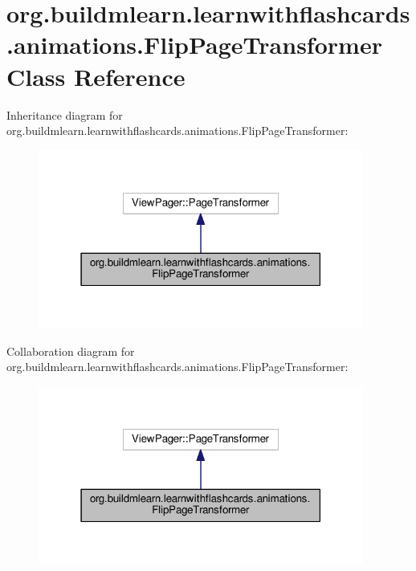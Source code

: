 \hypertarget{classorg_1_1buildmlearn_1_1learnwithflashcards_1_1animations_1_1FlipPageTransformer}{}\section{org.\+buildmlearn.\+learnwithflashcards.\+animations.\+Flip\+Page\+Transformer Class Reference}
\label{classorg_1_1buildmlearn_1_1learnwithflashcards_1_1animations_1_1FlipPageTransformer}


Inheritance diagram for org.\+buildmlearn.\+learnwithflashcards.\+animations.\+Flip\+Page\+Transformer\+:
\nopagebreak
\begin{figure}[H]
\begin{center}
\leavevmode
\includegraphics[width=303pt]{classorg_1_1buildmlearn_1_1learnwithflashcards_1_1animations_1_1FlipPageTransformer__inherit__graph}
\end{center}
\end{figure}


Collaboration diagram for org.\+buildmlearn.\+learnwithflashcards.\+animations.\+Flip\+Page\+Transformer\+:
\nopagebreak
\begin{figure}[H]
\begin{center}
\leavevmode
\includegraphics[width=303pt]{classorg_1_1buildmlearn_1_1learnwithflashcards_1_1animations_1_1FlipPageTransformer__coll__graph}
\end{center}
\end{figure}
